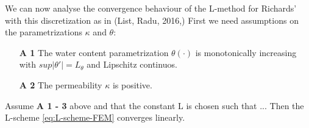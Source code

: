 \documentclass[../Main/main.tex]{subfiles}
\begin{document}
	We can now analyse the convergence behaviour of the L-method for Richards' with this discretization as in (List, Radu, 2016,\cite{list2016study})
	First we need assumptions on the parametrizations $\kappa $ and $\theta$:
	\begin{itemize}
		\item[\textbf{A 1}] The water content parametrization $\theta(\cdot)$ is monotonically increasing with $sup|\theta'| = L_{\theta}$ and Lipschitz continuos.
		\item[\textbf{A 2}] The permeability $\kappa$ is positive. 
	\end{itemize}
	\begin{theorem}
		Assume \textbf{A 1 - 3} above and that the constant L is chosen such that ... Then the L-scheme \eqref{eq:L-scheme-FEM} converges linearly. 
	\end{theorem}
\end{document}
